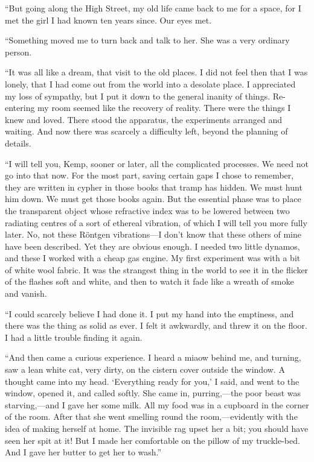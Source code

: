 “But going along the High Street, my old life came back to me for a space, for I met the girl I had known ten years since. Our eyes met.

“Something moved me to turn back and talk to her. She was a very ordinary person.

“It was all like a dream, that visit to the old places. I did not feel then that I was lonely, that I had come out from the world into a desolate place. I appreciated my loss of sympathy, but I put it down to the general inanity of things. Re-entering my room seemed like the recovery of reality. There were the things I knew and loved. There stood the apparatus, the experiments arranged and waiting. And now there was scarcely a difficulty left, beyond the planning of details.

“I will tell you, Kemp, sooner or later, all the complicated processes. We need not go into that now. For the most part, saving certain gaps I chose to remember, they are written in cypher in those books that tramp has hidden. We must hunt him down. We must get those books again. But the essential phase was to place the transparent object whose refractive index was to be lowered between two radiating centres of a sort of ethereal vibration, of which I will tell you more fully later. No, not these Röntgen vibrations—I don’t know that these others of mine have been described. Yet they are obvious enough. I needed two little dynamos, and these I worked with a cheap gas engine. My first experiment was with a bit of white wool fabric. It was the strangest thing in the world to see it in the flicker of the flashes soft and white, and then to watch it fade like a wreath of smoke and vanish.

“I could scarcely believe I had done it. I put my hand into the emptiness, and there was the thing as solid as ever. I felt it awkwardly, and threw it on the floor. I had a little trouble finding it again.

“And then came a curious experience. I heard a miaow behind me, and turning, saw a lean white cat, very dirty, on the cistern cover outside the window. A thought came into my head. ‘Everything ready for you,’ I said, and went to the window, opened it, and called softly. She came in, purring,—the poor beast was starving,—and I gave her some milk. All my food was in a cupboard in the corner of the room. After that she went smelling round the room,—evidently with the idea of making herself at home. The invisible rag upset her a bit; you should have seen her spit at it! But I made her comfortable on the pillow of my truckle-bed. And I gave her butter to get her to wash.”

